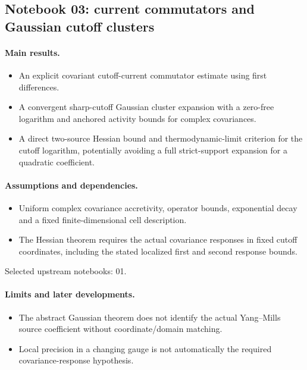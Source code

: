 \documentclass[11pt]{article}
\theoremstyle{remark}
\begin{document}
\subsection{Notebook 03: current commutators and Gaussian cutoff clusters}
\label{hnc-03}
\noindent{}\par

\paragraph{Main results.}
\begin{itemize}
\item An explicit covariant cutoff-current commutator estimate using first differences.
\item A convergent sharp-cutoff Gaussian cluster expansion with a zero-free logarithm and anchored activity bounds for complex covariances.
\item A direct two-source Hessian bound and thermodynamic-limit criterion for the cutoff logarithm, potentially avoiding a full strict-support expansion for a quadratic coefficient.
\end{itemize}

\paragraph{Assumptions and dependencies.}
\begin{itemize}
\item Uniform complex covariance accretivity, operator bounds, exponential decay and a fixed finite-dimensional cell description.
\item The Hessian theorem requires the actual covariance responses in fixed cutoff coordinates, including the stated localized first and second response bounds.
\end{itemize}

Selected upstream notebooks: 01.\par

\paragraph{Limits and later developments.}
\begin{itemize}
\item The abstract Gaussian theorem does not identify the actual Yang--Mills source coefficient without coordinate/domain matching.
\item Local precision in a changing gauge is not automatically the required covariance-response hypothesis.
\end{itemize}
\end{document}

